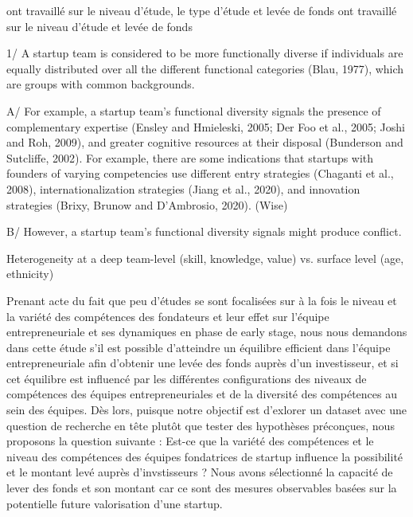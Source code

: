 \documentclass[12pt]{article}
\begin{document}
\citep{pinelli2020too} ont travaillé sur le niveau d'étude, le type d'étude et levée de fonds
\citep{ratzinger2018impact} ont travaillé sur le niveau d'étude et levée de fonds

1/ A startup team is considered to be more functionally diverse if individuals are equally distributed over all the different functional categories (Blau, 1977), which are groups with common backgrounds.

A/ For example, a startup team’s functional diversity signals the presence of complementary expertise (Ensley and Hmieleski, 2005; Der Foo et al., 2005; Joshi and Roh, 2009), and greater cognitive resources at their disposal (Bunderson and Sutcliffe, 2002). For example, there are some indications that startups with founders of varying competencies use different entry strategies (Chaganti et al., 2008), internationalization strategies (Jiang et al., 2020), and innovation strategies (Brixy, Brunow and D’Ambrosio, 2020). (Wise)

B/ However, a startup team’s functional diversity signals might produce conflict.


Heterogeneity at a deep team-level (skill, knowledge, value) vs. surface level (age, ethnicity)


Prenant acte du fait que peu d'études se sont focalisées sur à la fois le niveau et la variété des compétences des fondateurs et leur effet sur l'équipe entrepreneuriale et ses dynamiques en phase de early stage, nous nous demandons dans cette étude s'il est possible d'atteindre un équilibre efficient dans l'équipe entrepreneuriale afin d'obtenir une levée des fonds auprès d'un investisseur, et si cet équilibre est influencé par les différentes configurations des niveaux de compétences des équipes entrepreneuriales et de la diversité des compétences au sein des équipes. Dès lors, puisque notre objectif est d'exlorer un dataset avec une question de recherche en tête plutôt que tester des hypothèses préconçues, nous proposons la question suivante : Est-ce que la variété des compétences et le niveau des compétences des équipes fondatrices de startup influence la possibilité et le montant levé auprès d'invstisseurs ? Nous avons sélectionné la capacité de lever des fonds et son montant car ce sont des mesures observables basées sur la potentielle future valorisation d'une startup.
\end{document}
